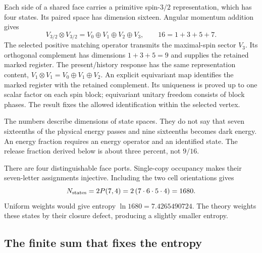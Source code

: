 Each side of a shared face carries a primitive spin-$3/2$ representation,
which has four states. Its paired space has dimension sixteen. Angular
momentum addition gives
\begin{equation}
V_{3/2}\otimes V_{3/2}=V_0\oplus V_1\oplus V_2\oplus V_3,
\qquad 16=1+3+5+7.
\end{equation}
The selected positive matching operator transmits the maximal-spin sector
$V_3$. Its orthogonal complement has dimensions $1+3+5=9$ and supplies the
retained marked register. The present/history response has the same
representation content, $V_1\otimes V_1=V_0\oplus V_1\oplus V_2$.
An explicit equivariant map identifies the marked register with the
retained complement. Its uniqueness is proved up to one scalar factor
on each spin block; equivariant unitary freedom consists of block phases.
The result fixes the allowed identification within the selected vertex.

The numbers describe dimensions of state spaces. They do not say that
seven sixteenths of the physical energy passes and nine sixteenths becomes
dark energy. An energy fraction requires an energy operator and an
identified state. The release fraction derived below is about three
percent, not $9/16$.

There are four distinguishable face ports. Single-copy occupancy makes
their seven-letter assignments injective. Including the two cell
orientations gives
\begin{equation}
N_{\rm states}=2P(7,4)=2\,(7\cdot6\cdot5\cdot4)=1680.
\end{equation}
Uniform weights would give entropy $\ln1680=7.4265490724$. The theory
weights these states by their closure defect, producing a slightly smaller
entropy. 

\subsection{The finite sum that fixes the entropy}

